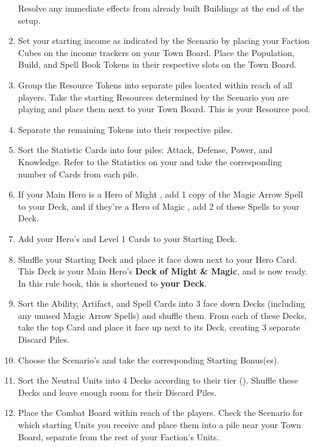 \begin{multicols*}{2}
\begin{enumerate}
    Resolve any immediate effects from already built Buildings at the end of the setup.
  \item Set your starting income as indicated by the Scenario by placing your Faction Cubes on the income trackers on your Town Board.
    Place the Population, Build, and Spell Book Tokens in their respective slots on the Town Board.
  \item Group the Resource Tokens into separate piles located within reach of all players.
    Take the starting Resources determined by the Scenario you are playing and place them next to your Town Board.
    This is your Resource pool.
  \item Separate the remaining Tokens into their respective piles.
  \item Sort the Statistic Cards into four piles: Attack, Defense, Power, and Knowledge.
    Refer to the Statistics on your  and take the corresponding number of Cards from each pile.
  \item If your Main Hero is a Hero of Might , add 1 copy of the Magic Arrow Spell to your Deck, and if they’re a Hero of Magic , add 2 of these Spells to your Deck.
  \item Add your Hero's  and Level 1  Cards to your Starting Deck.
  \item Shuffle your Starting Deck and place it face down next to your Hero Card.
    This Deck is your Main Hero's \textbf{Deck of Might \& Magic}, and is now ready. In this rule book, this is shortened to \textbf{your Deck}.
  \item Sort the Ability, Artifact, and Spell Cards into 3 face down Decks (including any unused Magic Arrow Spells) and shuffle them.
    From each of these Decks, take the top Card and place it face up next to its Deck, creating 3 separate Discard Piles.
  \item Choose the Scenario's  and take the corresponding Starting Bonus(es).
  \item Sort the Neutral Units into 4 Decks according to their tier ().
    Shuffle these Decks and leave enough room for their Discard Piles.
  \item Place the Combat Board within reach of the players.
    Check the Scenario for which starting Units you receive and place them into a pile near your Town Board, separate from the rest of your Faction’s Units.

\end{enumerate}
\end{multicols*}
